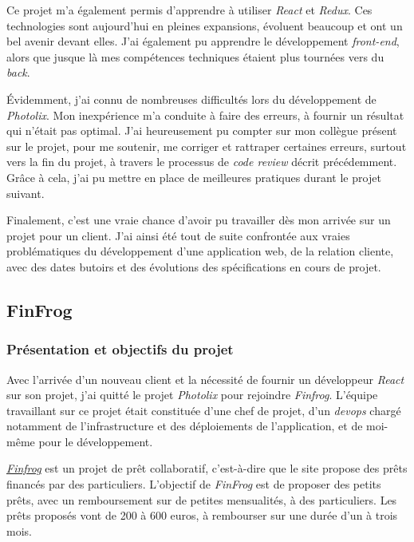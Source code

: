 \documentclass[12pt,a4paper]{article}
\begin{document}
  \bigskip

  Ce projet m'a également permis d'apprendre à utiliser \emph{React} et
  \emph{Redux}. Ces technologies sont aujourd'hui en pleines expansions,
  évoluent beaucoup et ont un bel avenir devant elles. J'ai également pu
  apprendre le développement \emph{front-end}, alors que jusque là mes
  compétences techniques étaient plus tournées vers du \emph{back}.

  \bigskip

  Évidemment, j'ai connu de nombreuses difficultés lors du développement
  de \emph{Photolix}. Mon inexpérience m'a conduite à faire des erreurs, à
  fournir un résultat qui n'était pas optimal. J'ai heureusement pu
  compter sur mon collègue présent sur le projet, pour me soutenir, me
  corriger et rattraper certaines erreurs, surtout vers la fin du projet,
  à travers le processus de \emph{code review} décrit précédemment. Grâce
  à cela, j'ai pu mettre en place de meilleures pratiques durant le projet
  suivant.

  \bigskip

  Finalement, c'est une vraie chance d'avoir pu travailler dès mon arrivée
  sur un projet pour un client. J'ai ainsi été tout de suite confrontée
  aux vraies problématiques du développement d'une application web, de la
  relation cliente, avec des dates butoirs et des évolutions des
  spécifications en cours de projet.

  \subsection{FinFrog}\label{finfrog}

  \subsubsection{Présentation et objectifs du
  projet}\label{pruxe9sentation-et-objectifs-du-projet-1}

  \bigskip

  Avec l'arrivée d'un nouveau client et la nécessité de fournir un
  développeur \emph{React} sur son projet, j'ai quitté le projet
  \emph{Photolix} pour rejoindre \emph{Finfrog}. L'équipe travaillant sur
  ce projet était constituée d'une chef de projet, d'un \emph{devops}
  chargé notamment de l'infrastructure et des déploiements de
  l'application, et de moi-même pour le développement.

  \bigskip

  \href{https://finfrog.fr/}{\emph{Finfrog}} est un projet de prêt
  collaboratif, c'est-à-dire que le site propose des prêts financés par
  des particuliers. L'objectif de \emph{FinFrog} est de proposer des
  petits prêts, avec un remboursement sur de petites mensualités, à des
  particuliers. Les prêts proposés vont de 200 à 600 euros, à rembourser
  sur une durée d'un à trois mois.
\end{document}
